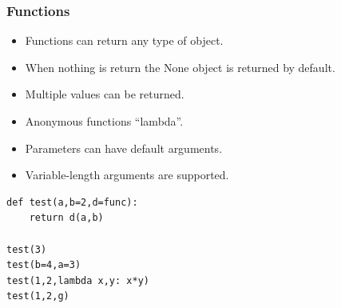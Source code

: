 \begin{frame}[fragile]\frametitle{Functions}
  \begin{itemize}
  \item Functions can return any type of object.
  \item When nothing is return the None object is returned by default.
  \item Multiple values can be returned.
  \item Anonymous functions ``lambda''.
  \item Parameters can have default arguments.
  \item Variable-length arguments are supported.
  \end{itemize}
  \begin{lstlisting}
def test(a,b=2,d=func):
    return d(a,b)

test(3)
test(b=4,a=3)
test(1,2,lambda x,y: x*y)
test(1,2,g)
  \end{lstlisting}
\end{frame}





